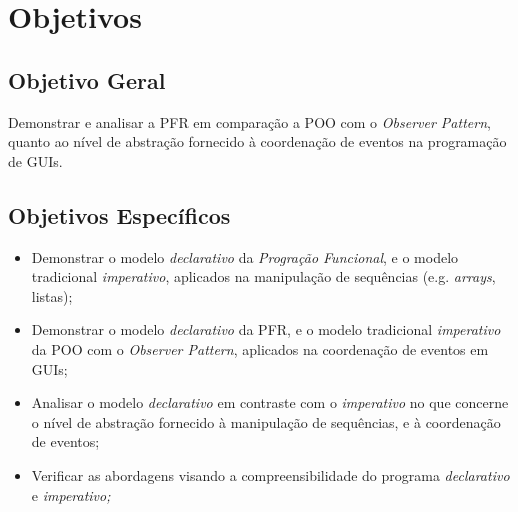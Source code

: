 \section{Objetivos}\label{lobjetivos}

\subsection{Objetivo Geral}

Demonstrar e analisar a PFR em comparação a POO com o
\emph{Observer Pattern}, quanto ao nível de abstração
fornecido à coordenação de eventos na programação de GUIs.

\subsection{Objetivos Específicos}

\begin{itemize}[noitemsep]
  \item Demonstrar o modelo \emph{declarativo} da
        \emph{Progração Funcional}, e o modelo tradicional \emph{imperativo},
        aplicados na manipulação de sequências (e.g. \emph{arrays}, listas);
  \item Demonstrar o modelo \emph{declarativo} da PFR,
        e o modelo tradicional \emph{imperativo} da POO
        com o \emph{Observer Pattern}, aplicados na coordenação
        de eventos em GUIs;
  \item Analisar o modelo \emph{declarativo} em contraste com o
        \emph{imperativo} no que concerne o nível de abstração
        fornecido à manipulação de sequências,
        e à coordenação de eventos;
  \item Verificar as abordagens visando a compreensibilidade
        do programa \emph{declarativo} e \emph{imperativo;}
\end{itemize}

